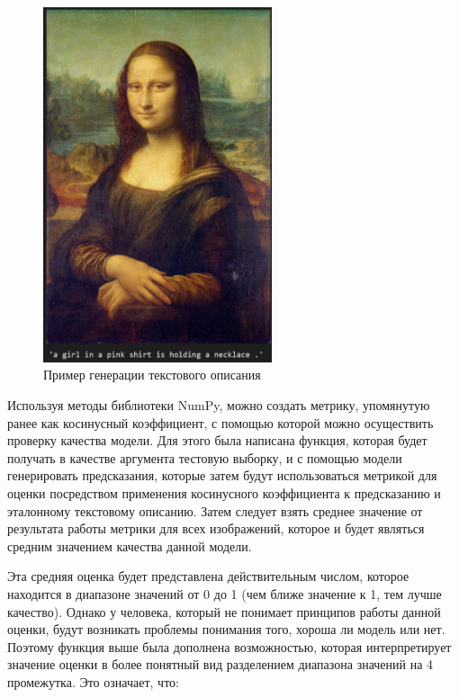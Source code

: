 \documentclass[bachelor, och, coursework]{SCWorks}
\begin{document}
        \begin{figure}[H]
            \centering
            \includegraphics[width=0.6\textwidth]{pics/caption.png}
            \caption{Пример генерации текстового описания}
        \end{figure}

        Используя методы библиотеки NumPy, можно создать метрику, упомянутую
        ранее как косинусный коэффициент, с помощью которой можно осуществить
        проверку качества модели. Для этого была написана функция, которая будет
        получать в качестве аргумента тестовую выборку, и с помощью модели
        генерировать предсказания, которые затем будут использоваться метрикой
        для оценки посредством применения косинусного коэффициента к
        предсказанию и эталонному текстовому описанию. Затем следует взять
        среднее значение от результата работы метрики для всех изображений,
        которое и будет являться средним значением качества данной модели.
        
        Эта средняя оценка будет представлена действительным числом, которое
        находится в диапазоне значений от 0 до 1 (чем ближе значение к 1, тем
        лучше качество). Однако у человека, который не понимает принципов работы
        данной оценки, будут возникать проблемы понимания того, хороша ли модель
        или нет. Поэтому функция выше была дополнена возможностью, которая
        интерпретирует значение оценки в более понятный вид разделением
        диапазона значений на 4 промежутка. Это означает, что:
        
\end{document}
